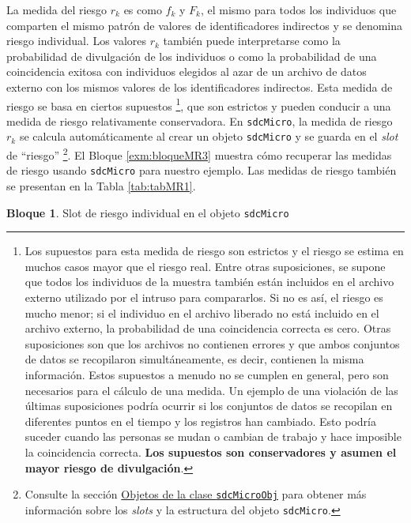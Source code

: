 \documentclass[]{book}
\theoremstyle{definition}
\theoremstyle{definition}
\newtheorem{example}{Bloque}[chapter]
\theoremstyle{definition}
\theoremstyle{definition}
\theoremstyle{remark}
\begin{document}
La medida del riesgo \(r_{k}\) es como \(f_{k}\) y \(F_{k}\), el mismo para todos los individuos que comparten el mismo patrón de valores de identificadores indirectos y se denomina riesgo individual. Los valores \(r_{k}\) también puede interpretarse como la probabilidad de divulgación de los individuos o como la probabilidad de una coincidencia exitosa con individuos elegidos al azar de un archivo de datos externo con los mismos valores de los identificadores indirectos. Esta medida de riesgo se basa en ciertos supuestos \footnote{Los supuestos para esta medida de riesgo son estrictos y el riesgo se estima en muchos casos mayor que el riesgo real. Entre otras suposiciones, se supone que todos los individuos de la muestra también están incluidos en el archivo externo utilizado por el intruso para compararlos. Si no es así, el riesgo es mucho menor; si el individuo en el archivo liberado no está incluido en el archivo externo, la probabilidad de una coincidencia correcta es cero. Otras suposiciones son que los archivos no contienen errores y que ambos conjuntos de datos se recopilaron simultáneamente, es decir, contienen la misma información. Estos supuestos a menudo no se cumplen en general, pero son necesarios para el cálculo de una medida. Un ejemplo de una violación de las últimas suposiciones podría ocurrir si los conjuntos de datos se recopilan en diferentes puntos en el tiempo y los registros han cambiado. Esto podría suceder cuando las personas se mudan o cambian de trabajo y hace imposible la coincidencia correcta. \textbf{Los supuestos son conservadores y asumen el mayor riesgo de divulgación}.}, que son estrictos y pueden conducir a una medida de riesgo relativamente conservadora. En \texttt{sdcMicro}, la medida de riesgo \(r_{k}\) se calcula automáticamente al crear un objeto \texttt{sdcMicro} y se guarda en el \emph{slot} de ``riesgo'' \footnote{Consulte la sección \protect\hyperlink{objetos-de-la-clase-sdcmicroobj}{Objetos de la clase \texttt{sdcMicroObj}} para obtener más información sobre los \emph{slots} y la estructura del objeto \texttt{sdcMicro}.}. El Bloque \ref{exm:bloqueMR3} muestra cómo recuperar las medidas de riesgo usando \texttt{sdcMicro} para nuestro ejemplo. Las medidas de riesgo también se presentan en la Tabla \ref{tab:tabMR1}.

\begin{example}
\protect\hypertarget{exm:bloqueMR3}{}{\label{exm:bloqueMR3} }Slot de riesgo individual en el objeto \texttt{sdcMicro}
\end{example}
\end{document}
